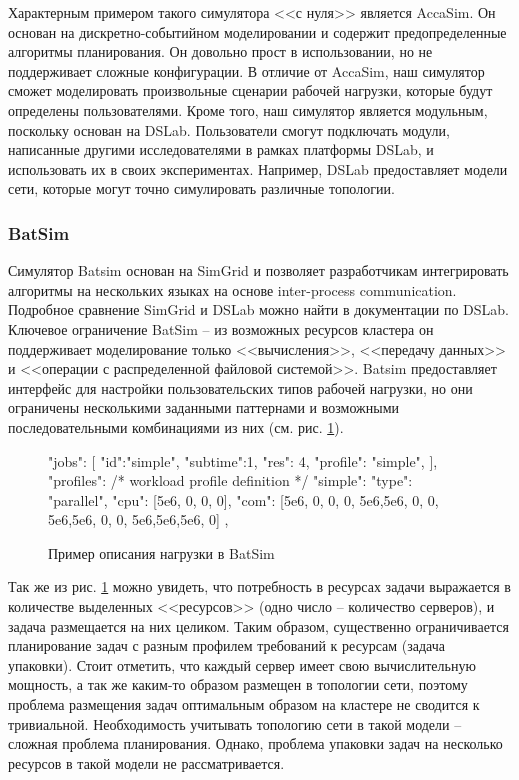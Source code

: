 Характерным примером такого симулятора <<с нуля>> является AccaSim\cite{accasim-article}. Он основан на дискретно-событийном моделировании и содержит предопределенные алгоритмы планирования. Он довольно прост в использовании, но не поддерживает сложные конфигурации. В отличие от AccaSim, наш симулятор сможет моделировать произвольные сценарии рабочей нагрузки, которые будут определены пользователями. Кроме того, наш симулятор является модульным, поскольку основан на DSLab. Пользователи смогут подключать модули, написанные другими исследователями в рамках платформы DSLab, и использовать их в своих экспериментах. Например, DSLab предоставляет модели сети, которые могут точно симулировать различные топологии.

\subsubsection{BatSim}

Симулятор Batsim основан на SimGrid\cite{simgrid-article} и позволяет разработчикам интегрировать алгоритмы на нескольких языках на основе inter-process communication. Подробное сравнение SimGrid и DSLab можно найти в документации по DSLab\cite{dslab-analog-cmp}. Ключевое ограничение BatSim -- из возможных ресурсов кластера он поддерживает моделирование только <<вычисления>>, <<передачу данных>> и <<операции с распределенной файловой системой>>. Batsim предоставляет интерфейс для настройки пользовательских типов рабочей нагрузки, но они ограничены несколькими заданными паттернами и возможными последовательными комбинациями из них (см. рис. \ref{fig:batsim-profile}). 

\begin{figure}[h]
    \footnotesize  
\begin{jsoncode}
"jobs": [
  {"id":"simple", "subtime":1, "res": 4, "profile": "simple"},
],
"profiles": {
  /* workload profile definition */
  "simple": {
    "type": "parallel",
    "cpu": [5e6,  0,  0,  0],
    "com": [5e6,  0,  0,  0,
            5e6,5e6,  0,  0,
            5e6,5e6,  0,  0,
            5e6,5e6,5e6,  0]
  },
}
\end{jsoncode}
\caption{Пример описания нагрузки в BatSim}
\label{fig:batsim-profile}
\end{figure}

Так же из рис. \ref{fig:batsim-profile} можно увидеть, что потребность в ресурсах задачи выражается в количестве выделенных <<ресурсов>> (одно число -- количество серверов), и задача размещается на них целиком. Таким образом, существенно ограничивается планирование задач с разным профилем требований к ресурсам (задача упаковки). Стоит отметить, что каждый сервер имеет свою вычислительную мощность, а так же каким-то образом размещен в топологии сети, поэтому проблема размещения задач оптимальным образом на кластере не сводится к тривиальной. Необходимость учитывать топологию сети в такой модели -- сложная проблема планирования. Однако, проблема упаковки задач на несколько ресурсов в такой модели не рассматривается.

